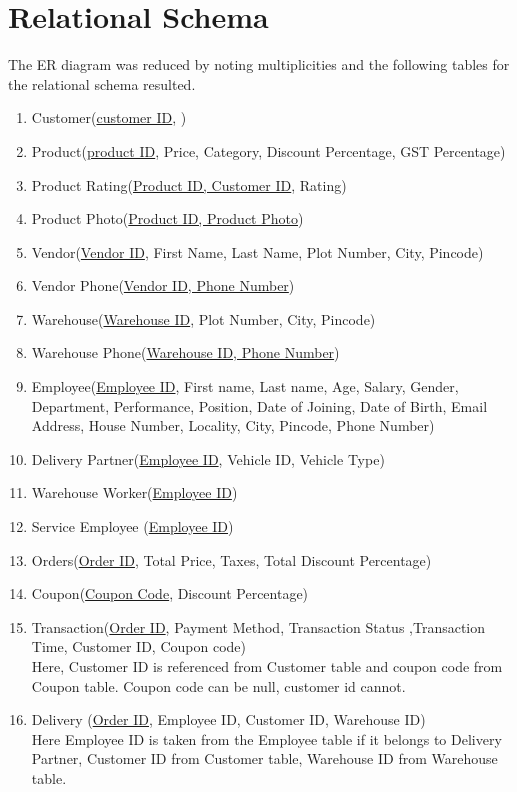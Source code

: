 \documentclass[12pt]{report}
\begin{document}
\chapter{Relational Schema}
The ER diagram was reduced by noting multiplicities and the following tables for the relational schema resulted.

\begin{enumerate}
	\item Customer(\underline{customer ID}, )
	\item Product(\underline{product ID}, Price, Category, Discount Percentage, GST Percentage)
	\item Product Rating(\underline{Product ID, Customer ID}, Rating)
	\item Product Photo(\underline{Product ID, Product Photo})
	\item Vendor(\underline{Vendor ID}, First Name, Last Name, Plot Number, City, Pincode)
	\item Vendor Phone(\underline{Vendor ID, Phone Number})
	\item Warehouse(\underline{Warehouse ID}, Plot Number, City, Pincode)
	\item Warehouse Phone(\underline{Warehouse ID, Phone Number})
	\item Employee(\underline{Employee ID}, First name, Last name, Age, Salary, Gender, Department, Performance, Position, Date of Joining, Date of Birth, Email Address, House Number, Locality, City, Pincode, Phone Number)
	\item Delivery Partner(\underline{Employee ID}, Vehicle ID, Vehicle Type)
	\item Warehouse Worker(\underline{Employee ID})
	\item Service Employee (\underline{Employee ID})
	\item Orders(\underline{Order ID}, Total Price, Taxes, Total Discount Percentage)
	\item Coupon(\underline{Coupon Code}, Discount Percentage)
	\item Transaction(\underline{Order ID}, Payment Method, Transaction Status ,Transaction Time, Customer ID, Coupon code)\\ Here, Customer ID is referenced from Customer table and coupon code from Coupon table. Coupon code can be null, customer id cannot.
	\item Delivery (\underline{Order ID}, Employee ID, Customer ID, Warehouse ID) \\ Here Employee ID is taken from the Employee table if it belongs to Delivery Partner, Customer ID from Customer table, Warehouse ID from Warehouse table.

\end{enumerate}
\end{document}

